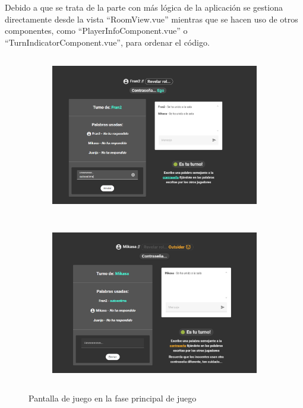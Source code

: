 Debido a que se trata de la parte con más lógica de la aplicación se gestiona directamente desde la vista ``RoomView.vue'' mientras
que se hacen uso de otros componentes, como ``PlayerInfoComponent.vue'' o ``TurnIndicatorComponent.vue'', para ordenar el código.

\begin{figure}[h]													
	\begin{subfigure}{\textwidth}
		\centering
		\includegraphics[height=7cm]{res_juego1.png}
	\end{subfigure}
																																																																																																																																																																													
	\begin{subfigure}{\textwidth}
		\centering
		\includegraphics[height=7cm]{res_juego2.png} 
	\end{subfigure}																																																																																																																																																																														
	\caption{Pantalla de juego en la fase principal de juego}
	\label{fig:res_juego}										
\end{figure}

